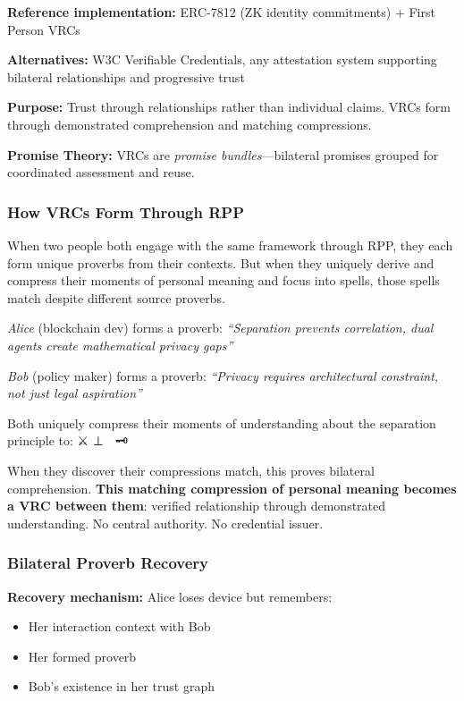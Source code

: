 \documentclass[
  11pt,
]{article}
\begin{document}
\textbf{Reference implementation:} ERC-7812 (ZK identity commitments) +
First Person VRCs

\textbf{Alternatives:} W3C Verifiable Credentials, any attestation
system supporting bilateral relationships and progressive trust

\textbf{Purpose:} Trust through relationships rather than individual
claims. VRCs form through demonstrated comprehension and matching
compressions.

\textbf{Promise Theory:} VRCs are \emph{promise bundles}---bilateral
promises grouped for coordinated assessment and reuse.

\subsubsection{How VRCs Form Through
RPP}\label{how-vrcs-form-through-rpp}

When two people both engage with the same framework through RPP, they
each form unique proverbs from their contexts. But when they uniquely
derive and compress their moments of personal meaning and focus into
spells, those spells match despite different source proverbs.

\emph{Alice} (blockchain dev) forms a proverb: \emph{``Separation
prevents correlation, dual agents create mathematical privacy gaps''}

\emph{Bob} (policy maker) forms a proverb: \emph{``Privacy requires
architectural constraint, not just legal aspiration''}

Both uniquely compress their moments of understanding about the
separation principle to: ⚔️ ⊥ 🧙 \textbar{} 🗝️

When they discover their compressions match, this proves bilateral
comprehension. \textbf{This matching compression of personal meaning
becomes a VRC between them}: verified relationship through demonstrated
understanding. No central authority. No credential issuer.

\subsubsection{Bilateral Proverb
Recovery}\label{bilateral-proverb-recovery}

\textbf{Recovery mechanism:} Alice loses device but remembers:

\begin{itemize}
\item
  Her interaction context with Bob
\item
  Her formed proverb
\item
  Bob's existence in her trust graph
\end{itemize}
\end{document}

